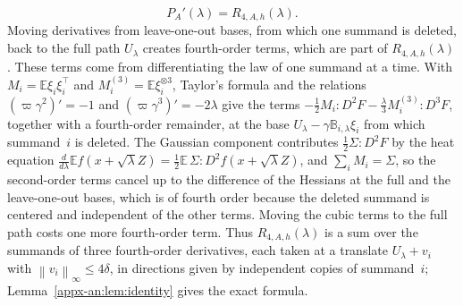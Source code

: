 \documentclass[11pt,letterpaper]{article}
\newif\ifshowrev
\newcommand{\rev}[1]{\ifshowrev{\color{revblue}%
\hypersetup{linkcolor=revblue,citecolor=revblue,urlcolor=revblue}#1}\else#1\fi}
\newenvironment{revblock}{\ifshowrev\color{revblue}%
\hypersetup{linkcolor=revblue,citecolor=revblue,urlcolor=revblue}\fi}{}
\newif\ifshowpass
\newcommand{\pass}[1]{\ifshowpass{\color{revblue}%
\hypersetup{linkcolor=revblue,citecolor=revblue,urlcolor=revblue}#1}\else#1\fi}
\newif\ifshowlin
\newcommand{\lin}[1]{\ifshowlin{\color{revblue}%
\hypersetup{linkcolor=revblue,citecolor=revblue,urlcolor=revblue}#1}\else#1\fi}
\newif\ifshowskill
\newcommand{\sks}[1]{\ifshowskill{\color{revblue}#1}\else#1\fi}
\theoremstyle{remark}
\newcommand{\E}{\mathbb E}
\newcommand{\norm}[1]{\left\lVert#1\right\rVert}
\begin{document}
\begin{equation}
 P_A'(\lambda)=R_{4,A,h}(\lambda).
 \label{zs:identity}
\end{equation}
Moving derivatives from \rev{leave-one-out} bases\lin{, from which one
summand is deleted,} back
to \lin{the full path} \(U_\lambda\)
creates fourth-order terms, \rev{which are part of}
\(R_{4,A,h}(\lambda)\).
\begin{revblock}
These terms come from differentiating the law of one summand at a time.
With \(M_i=\E\xi_i\xi_i^\top\) and \(\sks{M_i^{(3)}}=\E\xi_i^{\otimes3}\), Taylor's
formula and the relations \((\sks{\varpi}\gamma^2)'=-1\) and
\((\sks{\varpi}\gamma^3)'=-2\lambda\) give the terms
\(-\frac12M_i:D^2F-\frac\lambda3\sks{M_i^{(3)}}:D^3F\), together with a fourth-order
remainder, at the base \(U_\lambda-\gamma \sks{\mathbb B}_{i,\lambda}\xi_i\) from which
summand~\(i\) is deleted. The Gaussian component contributes
\(\frac12\Sigma:D^2F\) by the heat equation\pass{
\(\frac d{d\lambda}\E f(x+\sqrt\lambda Z)
=\frac12\E\,\Sigma:D^2f(x+\sqrt\lambda Z)\)}, and \(\sum_iM_i=\Sigma\), so
the second-order terms cancel up to the difference of the Hessians at the
full and the leave-one-out bases, which is of fourth order because the
deleted summand is centered and independent of the other terms. Moving the
cubic terms to the full path costs one more fourth-order term. Thus
\(R_{4,A,h}(\lambda)\) is a sum over the summands of three fourth-order
derivatives, each taken at a translate \(U_\lambda+v_i\) with
\(\norm{v_i}_\infty\le4\delta\), in directions given by independent copies
of summand~\(i\); Lemma~\ref{appx-an:lem:identity} gives the exact formula.
\end{revblock}
\end{document}

